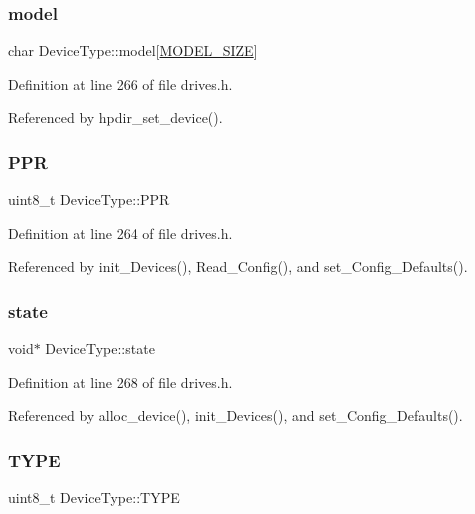 \subsubsection{\texorpdfstring{model}{model}}
{\footnotesize\ttfamily char Device\+Type\+::model\mbox{[}\hyperlink{drives__sup_8h_a3f11d81c1e6d925611a9bdd5115064a0}{M\+O\+D\+E\+L\+\_\+\+S\+I\+ZE}\mbox{]}}



Definition at line 266 of file drives.\+h.



Referenced by hpdir\+\_\+set\+\_\+device().

\mbox{\label{structDeviceType_ae0e59c6c17582ff80bdab3f2010e8d57}} 
\subsubsection{\texorpdfstring{P\+PR}{PPR}}
{\footnotesize\ttfamily uint8\+\_\+t Device\+Type\+::\+P\+PR}



Definition at line 264 of file drives.\+h.



Referenced by init\+\_\+\+Devices(), Read\+\_\+\+Config(), and set\+\_\+\+Config\+\_\+\+Defaults().

\mbox{\label{structDeviceType_ad0fc43d63606bab6c259047e36512e08}} 
\subsubsection{\texorpdfstring{state}{state}}
{\footnotesize\ttfamily void$\ast$ Device\+Type\+::state}



Definition at line 268 of file drives.\+h.



Referenced by alloc\+\_\+device(), init\+\_\+\+Devices(), and set\+\_\+\+Config\+\_\+\+Defaults().

\mbox{\label{structDeviceType_acee5219162b6f47a9423b2086d127ede}} 
\subsubsection{\texorpdfstring{T\+Y\+PE}{TYPE}}
{\footnotesize\ttfamily uint8\+\_\+t Device\+Type\+::\+T\+Y\+PE}



